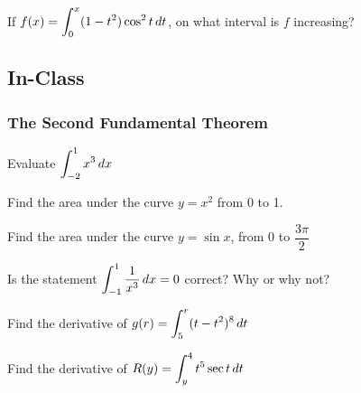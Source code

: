 \documentclass[notes]{subfiles}
\begin{document}
		\begin{ex}
			If $f(x) = \displaystyle \int_0^x (1-t^2)\cos^2 t\, dt$, on what interval is $f$ increasing?
		\end{ex}
			\newpage
			
	\subsection*{In-Class}
	\subsubsection*{The Second Fundamental Theorem}
		\begin{thm}
		\end{thm}
		\begin{ex}
			Evaluate $\displaystyle \int_{-2}^1 x^3\,dx$
		\end{ex}
			\newpage
			
		\begin{ex}
			Find the area under the curve $y = x^2$ from 0 to 1.
		\end{ex}
			
		\begin{ex}
			Find the area under the curve $y = \sin x$, from $0$ to $\dfrac{3\pi}{2}$
		\end{ex}
			
		\begin{ex}
			Is the statement $\displaystyle \int_{-1}^1 \dfrac{1}{x^3}\, dx = 0$ correct?  Why or why not?
		\end{ex}
			\newpage
	
		\begin{ex}
			Find the derivative of $g(r) = \displaystyle \int_5^r (t-t^2)^8\,dt$
		\end{ex}
			
		\begin{ex}
			Find the derivative of $R(y) = \displaystyle \int_{y}^4 t^5\sec t\, dt$
		\end{ex}
			
\end{document}
